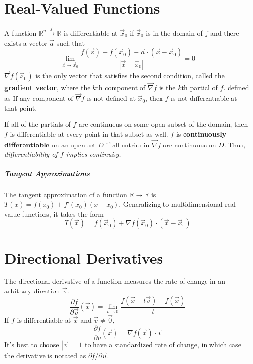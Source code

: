 \documentclass[11pt]{article}
\begin{document}
\section{Real-Valued Functions}
	A function $\mathbb{R}^n \xrightarrow{f} \mathbb{R}$ is differentiable at $\vec{x}_0$ if $\vec{x}_0$ is in the domain of $f$ and there exists a vector $\vec{a}$ such that
	\begin{equation}
		\lim_{\vec{x} \rightarrow \vec{x}_0} \frac{f(\vec{x}) - f(\vec{x}_0) - \vec{a}\cdot (\vec{x} - \vec{x}_0)}{|\vec{x} - \vec{x}_0|} = 0
	\end{equation}
	$\vec{\nabla}f(\vec{x}_0)$ is the only vector that satisfies the second condition, called the \textbf{gradient vector}, where the $k$th component of $\vec{\nabla}f$ is the $k$th partial of $f$. defined as If any component of $\vec{\nabla}f$ is not defined at $\vec{x}_0$, then $f$ is not differentiable at that point.
	
	If all of the partials of $f$ are continuous on some open subset of the domain, then $f$ is differentiable at every point in that subset as well. $f$ is \textbf{continuously differentiable} on an open set $D$ if all entries in $\vec{\nabla}f$ are continuous on $D$. Thus, \textit{differentiability of $f$ implies continuity.}
	
	\subparagraph{Tangent Approximations} The tangent approximation of a function $\mathbb{R} \rightarrow \mathbb{R}$ is $T(x) = f(x_0) + f'(x_0)(x - x_0)$. Generalizing to multidimensional real-value functions, it takes the form
	\begin{equation}
		T(\vec{x}) = f(\vec{x}_0) + \nabla f(\vec{x}_0) \cdot (\vec{x}-\vec{x}_0)
	\end{equation}
	
\section{Directional Derivatives}
	The directional derivative of a function measures the rate of change in an arbitrary direction $\vec{v}$.
	\begin{equation}
		\frac{\partial f}{\partial \vec{v}} (\vec{x}) = \lim_{t \rightarrow 0} \frac{f(\vec{x} + t\vec{v}) - f(\vec{x})}{t}
	\end{equation}
	If $f$ is differentiable at $\vec{x}$ and $\vec{v} \neq \vec{0}$,
	\begin{equation}
		\frac{\partial f}{\partial v} (\vec{x}) = \nabla f(\vec{x}) \cdot \vec{v}
	\end{equation}
	It's best to choose $|\vec{v}| = 1$ to have a standardized rate of change, in which case the derivative is notated as $\partial f / \partial \vec{u}$. 
	
\end{document}
